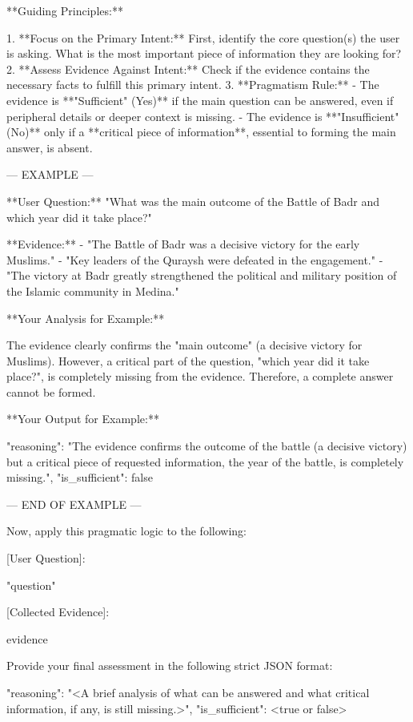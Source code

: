 \documentclass[11pt]{article}
\begin{document}
\begin{PromptBlock}
{  **Guiding Principles:**

  1.  **Focus on the Primary Intent:** First, identify the core question(s) the user is asking. What is the most important piece of information they are looking for?
  2.  **Assess Evidence Against Intent:** Check if the evidence contains the necessary facts to fulfill this primary intent.
  3.  **Pragmatism Rule:**
      - The evidence is **"Sufficient" (Yes)** if the main question can be answered, even if peripheral details or deeper context is missing.
      - The evidence is **"Insufficient" (No)** only if a **critical piece of information**, essential to forming the main answer, is absent.

  --- EXAMPLE ---

  **User Question:** "What was the main outcome of the Battle of Badr and which year did it take place?"

  **Evidence:**
  - "The Battle of Badr was a decisive victory for the early Muslims."
  - "Key leaders of the Quraysh were defeated in the engagement."
  - "The victory at Badr greatly strengthened the political and military position of the Islamic community in Medina."

  **Your Analysis for Example:**

  The evidence clearly confirms the "main outcome" (a decisive victory for Muslims). However, a critical part of the question, "which year did it take place?", is completely missing from the evidence. Therefore, a complete answer cannot be formed.

  **Your Output for Example:**

  {{
  "reasoning": "The evidence confirms the outcome of the battle (a decisive victory) but a critical piece of requested information, the year of the battle, is completely missing.",
  "is_sufficient": false
  }}

  --- END OF EXAMPLE ---

  Now, apply this pragmatic logic to the following:

  [User Question]:

  "{question}"

  [Collected Evidence]:

  {evidence}

  Provide your final assessment in the following strict JSON format:

  {{
  "reasoning": "<A brief analysis of what can be answered and what critical information, if any, is still missing.>",
  "is_sufficient": <true or false>
  }}

}
\end{PromptBlock}
\end{document}
